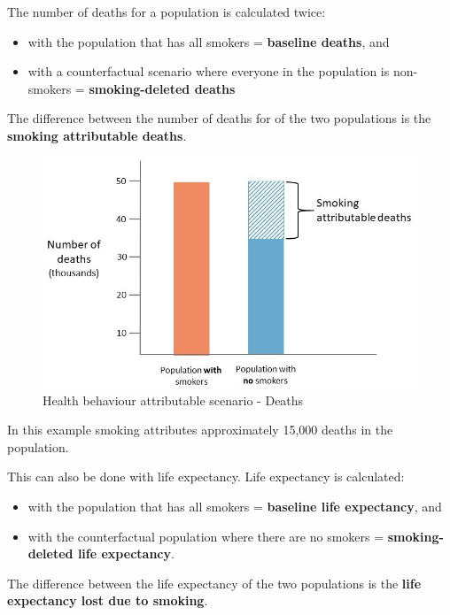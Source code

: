 \documentclass[]{book}
\providecommand{\tightlist}{%
  \setlength{\itemsep}{0pt}\setlength{\parskip}{0pt}}
\begin{document}
The number of deaths for a population is calculated twice:

\begin{itemize}
\tightlist
\item
  with the population that has all smokers = \textbf{baseline deaths}, and
\item
  with a counterfactual scenario where everyone in the population is non-smokers = \textbf{smoking-deleted deaths}
\end{itemize}

The difference between the number of deaths for of the two populations is the \textbf{smoking attributable deaths}.

\begin{figure}

{\centering \includegraphics{Images/HB attributable number of deaths} 

}

\caption{Health behaviour attributable scenario - Deaths}\label{fig:unnamed-chunk-13}
\end{figure}

In this example smoking attributes approximately 15,000 deaths in the population.

This can also be done with life expectancy. Life expectancy is calculated:

\begin{itemize}
\tightlist
\item
  with the population that has all smokers = \textbf{baseline life expectancy}, and
\item
  with the counterfactual population where there are no smokers = \textbf{smoking-deleted life expectancy}.
\end{itemize}

The difference between the life expectancy of the two populations is the \textbf{life expectancy lost due to smoking}.
\end{document}
